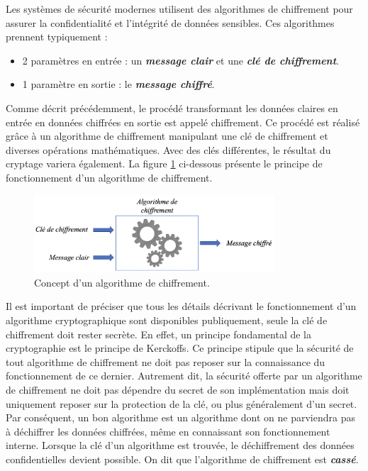 \documentclass[oneside]{book}
\begin{document}
\hspace{-0.5cm}Les systèmes de sécurité modernes utilisent des algorithmes de chiffrement pour assurer la confidentialité et l'intégrité de données sensibles. Ces algorithmes prennent typiquement : 
\begin{itemize}
\item  2 paramètres en entrée : un \textbf{\textit{message clair}} et une \textbf{\textit{clé de chiffrement}}.
\item 1 paramètre en sortie : le \textbf{\textit{message chiffré}}. \\
\end{itemize}
Comme décrit précédemment, le procédé transformant les données claires en entrée en données chiffrées en sortie est appelé chiffrement. Ce procédé est réalisé grâce à un algorithme de chiffrement manipulant une clé de chiffrement et diverses opérations mathématiques. Avec des clés différentes, le résultat du cryptage variera également. La figure \ref{fig:chiffrement} ci-dessous présente le principe de fonctionnement d'un algorithme de chiffrement.

\begin{figure}[htbp]
    \centering
    \includegraphics[width=0.8\textwidth]{image/chiffrement}
    \caption{Concept d'un algorithme de chiffrement.}
    \label{fig:chiffrement}
\end{figure}

Il est important de préciser que tous les détails décrivant le fonctionnement d'un algorithme cryptographique sont disponibles publiquement, seule la clé de chiffrement doit rester secrète. En effet, un principe fondamental de la cryptographie est le principe de Kerckoffs. Ce principe stipule que la sécurité de tout algorithme de chiffrement ne doit pas reposer sur la connaissance du fonctionnement de ce dernier. Autrement dit, la sécurité offerte par un algorithme de chiffrement ne doit pas dépendre du secret de son implémentation mais doit uniquement reposer sur la protection de la clé, ou plus généralement d'un secret. Par conséquent, un bon algorithme est un algorithme dont on ne parviendra pas à déchiffrer les données chiffrées, même en connaissant son fonctionnement interne. Lorsque la clé d'un algorithme est trouvée, le déchiffrement des données confidentielles devient possible. On dit que l'algorithme de chiffrement est \textbf{\textit{cassé}}.
\end{document}
